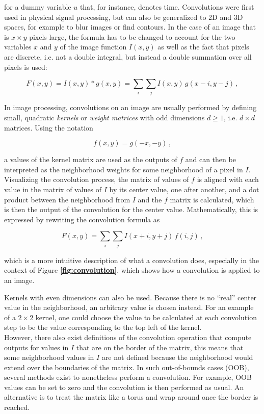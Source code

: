 for a dummy variable $u$ that, for instance, denotes time. Convolutions were first used in physical signal processing, but can also be generalized to 2D and 3D spaces, for example to blur images or find contours. In the case of an image that is $x \times y$ pixels large, the formula has to be changed to account for the two variables $x$ and $y$ of the image function $I(x, y)$ as well as the fact that pixels are discrete, i.e. not a double integral, but instead a double summation over all pixels is used:

\[ F(x, y) = I(x, y) * g(x, y) = \sum \limits_i \sum \limits_j I(x, y) \, g(x - i, y - j) \,, \] 

In image processing, convolutions on an image are usually performed by defining small, quadratic \textit{kernels} or \textit{weight matrices} with odd dimensions $d \geq 1$, i.e.  $d \times d$ matrices. Using the notation

\[ f(x, y) = g(-x, -y) \,, \]

a values of the kernel matrix are used as the outputs of $f$ and can then be interpreted as the neighborhood weights for some neighborhood of a pixel in $I$. Visualizing the convolution process, the matrix of values of $f$ is aligned with each value in the matrix of values of $I$ by its center value, one after another, and a dot product between the neighborhood from $I$ and the $f$ matrix is calculated, which is then the output of the convolution for the center value. Mathematically, this is expressed by rewriting the convolution formula as

\[ F(x, y) = \sum \limits_i \sum \limits_j I(x + i, y + j) \, f(i, j) \,, \]

which is a more intuitive description of what a convolution does, especially in the context of Figure \textbf{\ref{fig:convolution}}, which shows how a convolution is applied to an image. 

Kernels with even dimensions can also be used. Because there is no ``real'' center value in the neighborhood, an arbitrary value is chosen instead. For an example of a $2 \times 2$ kernel, one could choose the value to be calculated at each convolution step to be the value corresponding to the top left of the kernel. \cite[pp. 32-33]{machine_vision}\\

However, there also exist definitions of the convolution operation that compute outputs for values in $I$ that are on the border of the matrix, this means that some neighborhood values in $I$ are not defined because the neighborhood would extend over the boundaries of the matrix. In such out-of-bounds cases (OOB), several methods exist to nonetheless perform a convolution. For example, OOB values can be set to zero and the convolution is then performed as usual. An alternative is to treat the matrix like a torus and wrap around once the border is reached.

